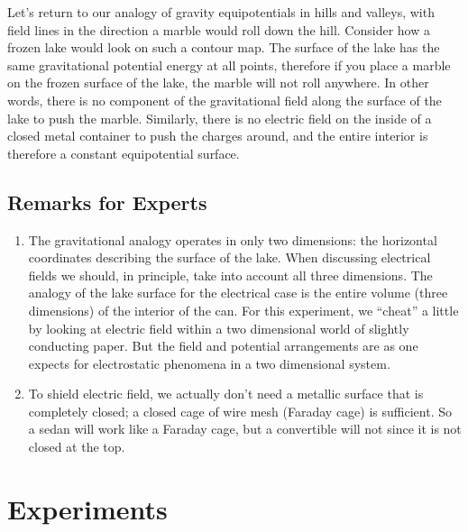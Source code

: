 Let's return to our analogy of gravity equipotentials in hills and valleys, with field lines in the direction a marble would roll down the hill. Consider how a frozen lake would look on such a contour map. The surface of the lake has the same gravitational potential energy at all points, therefore if you place a marble on the frozen surface of the lake, the marble will not roll anywhere. In other words, there is no component of the gravitational field along the surface of the lake to push the marble. Similarly, there is no electric field on the inside of a closed metal container to push the charges around, and the entire interior is therefore a constant equipotential surface.

\subsection{Remarks for Experts}

\begin{enumerate}
    \item The gravitational analogy operates in only two dimensions: the horizontal coordinates describing the surface of the lake. When discussing electrical fields we should, in principle, take into account all three dimensions. The analogy of the lake surface for the electrical case is the entire volume (three dimensions) of the interior of the can. For this experiment, we ``cheat'' a little by looking at electric field within a two dimensional world of slightly conducting paper. But the field and potential arrangements are as one expects for electrostatic phenomena in a two dimensional system.
    \item To shield electric field, we actually don't need a metallic surface that is completely closed; a closed cage of wire mesh (Faraday cage) is sufficient. So a sedan will work like a Faraday cage, but a convertible will not since it is not closed at the top.
\end{enumerate}

\section{Experiments}

